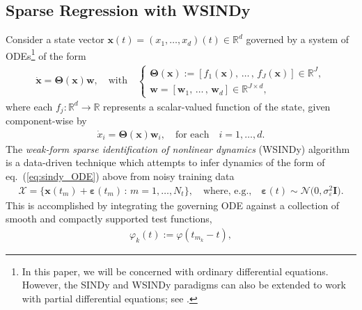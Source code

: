 \documentclass[journal=gmj]{CUP-JNL-DTM}%
\theoremstyle{definition}
\numberwithin{equation}{section}
\begin{document}
\newpage

\subsection{Sparse Regression with WSINDy}\label{subsec:wsindy}
Consider a state vector $\boldsymbol{x}(t) = (x_1, \dots, x_d)(t) \in \mathbb{R}^d$ governed by a system of ODEs\footnote{In this paper, we will be concerned with ordinary differential equations. However, the SINDy \cite{Brunton.etal2016ProcNatlAcadSciUSA} and WSINDy \cite{Messenger.Bortz2021MultiscaleModelSimul} paradigms can also be extended to work with partial differential equations; see \cite{Messenger.Bortz2021JournalofComputationalPhysics, Rudy.etal2017SciAdv, schaefferLearningPartialDifferential2017}.} of the form \begin{align}\label{eq:sindy_ODE}
    \dot{\boldsymbol{x}} = \mathbf{\Theta}(\boldsymbol{x})\mathbf{w},
    \quad \text{with} \quad
    \begin{cases}
        \mathbf{\Theta}(\boldsymbol{x}) := [f_1(\boldsymbol{x}), \, \dots \, , \, f_J(\boldsymbol{x})] \in \mathbb{R}^{J},
        \\
        \mathbf{w} = [\mathbf{w}_1, \, \dots \, , \, \mathbf{w}_d] \in \mathbb{R}^{J \times d},
    \end{cases}
\end{align} where each $f_j:\mathbb{R}^d \rightarrow \mathbb{R}$ represents a scalar-valued function of the state, given component-wise by \begin{align*}
    \dot{x}_i = \mathbf{\Theta}(\boldsymbol{x})\mathbf{w}_i,
    \quad \text{for each} \quad
    i = 1, \dots, d.
\end{align*} The \textit{weak-form sparse identification of nonlinear dynamics} (WSINDy) algorithm \cite{Messenger.Bortz2021JournalofComputationalPhysics} is a data-driven technique which attempts to infer dynamics of the form of eq.~(\ref{eq:sindy_ODE}) above from noisy training data \begin{align*}
    \mathcal{X} = \big\{\boldsymbol{x}(t_m) + \boldsymbol{\varepsilon}(t_m) \, : \, m = 1, \dots, N_t\big\},
    \quad \text{where, e.g.,} \quad
    \boldsymbol{\varepsilon}(t) \sim \mathcal{N}\big(0, \sigma^2_{\!\varepsilon}\mathbf{I}\big).
\end{align*} This is accomplished by integrating the governing ODE against a collection of smooth and compactly supported test functions, \begin{align*}
    \varphi_k(t) := \varphi(t_{m_k} - t),

\end{align*}
\end{document}
